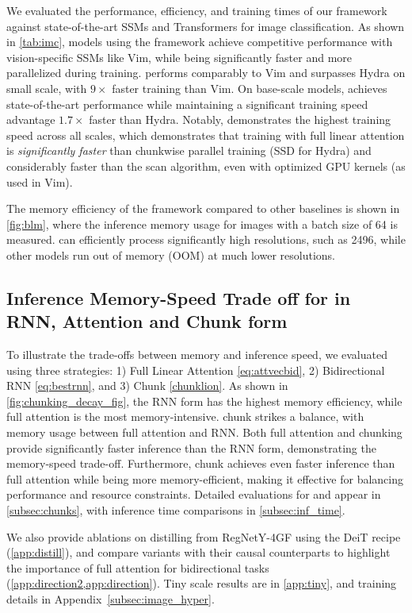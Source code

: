 We evaluated the performance, efficiency, and training times of our framework against state-of-the-art SSMs and Transformers for image classification. As shown in \cref{tab:imc}, models using the \lion framework achieve competitive performance with vision-specific SSMs like Vim, while being significantly faster and more parallelized during training. \lionrotd performs comparably to Vim and surpasses Hydra on small scale, with $9\times$ faster training than Vim. On base-scale models, \lion achieves state-of-the-art performance while maintaining a significant training speed advantage $1.7\times$ faster than Hydra. Notably, \lionlit demonstrates the highest training speed across all scales, which demonstrates that training with full linear attention is\textit{ significantly faster} than chunkwise parallel training (SSD for Hydra) and considerably faster than the scan algorithm, even with optimized GPU kernels (as used in Vim).


The memory efficiency of the \lion framework compared to other baselines is shown in \cref{fig:blm}, where the inference memory usage for images with a batch size of 64 is measured. \lion can efficiently process significantly high resolutions, such as 2496, while other models run out of memory (OOM) at much lower resolutions.

\subsection{Inference Memory-Speed Trade off for \lion in RNN, Attention and Chunk form}

To illustrate the trade-offs between memory and inference speed, we evaluated \lionretnet using three strategies: 1) Full Linear Attention \cref{eq:attvecbid}, 2) Bidirectional RNN \cref{eq:bestrnn}, and 3) \lion Chunk \cref{chunklion}. As shown in \cref{fig:chunking_decay_fig}, the RNN form has the highest memory efficiency, while full attention is the most memory-intensive. \lion chunk strikes a balance, with memory usage between full attention and RNN. Both full attention and chunking provide significantly faster inference than the RNN form, demonstrating the memory-speed trade-off. Furthermore, \lion chunk achieves even faster inference than full attention while being more memory-efficient, making it effective for balancing performance and resource constraints. Detailed evaluations for \lions and \lionlit appear in \cref{subsec:chunks}, with inference time comparisons in \cref{subsec:inf_time}. 

We also provide ablations on distilling \lions from RegNetY-4GF using the DeiT recipe (\cref{app:distill}), and compare \lion variants with their causal counterparts to highlight the importance of full attention for bidirectional tasks (\cref{app:direction2,app:direction}). Tiny scale results are in \cref{app:tiny}, and training details in Appendix~\ref{subsec:image_hyper}. 

